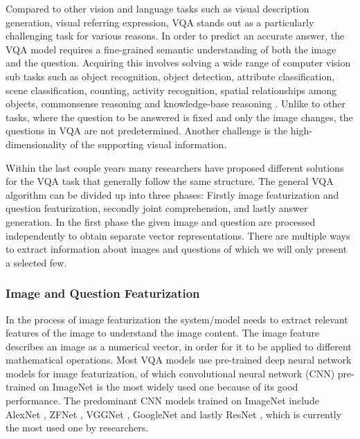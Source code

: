 \documentclass{article}
\begin{document}
Compared to other vision and language tasks such as visual description generation, visual referring expression, VQA stands out as a particularly challenging task for various reasons. In order to predict an accurate answer, the VQA model requires a fine-grained semantic understanding of both the image and the question. Acquiring this involves solving a wide range of computer vision sub tasks such as object recognition, object detection, attribute classification, scene classification, counting, activity recognition, spatial relationships among objects, commonsense reasoning and knowledge-base reasoning \citep{manmadhan2020vqa}. Unlike to other tasks, where the question to be answered is fixed and only the image changes, the questions in VQA are not predetermined. Another challenge is the high-dimensionality of the supporting visual information.

Within the last couple years many researchers have proposed different solutions for the VQA task that generally follow the same structure. The general VQA algorithm can be divided up into three phases: Firstly image featurization and question featurization, secondly joint comprehension, and lastly answer generation.
In the first phase the given image and question are processed independently to obtain separate vector representations. There are multiple ways to extract information about images and questions of which we will only present a selected few.

\subsubsection{Image and Question Featurization}

In the process of image featurization the system/model needs to extract relevant features of the image to understand the image content. The image feature describes an image as a numerical vector, in order for it to be applied to different mathematical operations. Most VQA models use pre-trained deep neural network models for image featurization, of which convolutional neural network (CNN) \citep{krizhevsky2012imagenet} pre-trained on ImageNet \citep{russakovsky2015imagenet} is the most widely used one because of its good performance. The predominant CNN models trained on ImageNet include AlexNet \citep{krizhevsky2012imagenet}, ZFNet \citep{zeiler2014visual}, VGGNet \citep{simonyan2015very}, GoogleNet \citep{szegedy2015going} and lastly ResNet \citep{residual}, which is currently the most used one by researchers.
\end{document}
